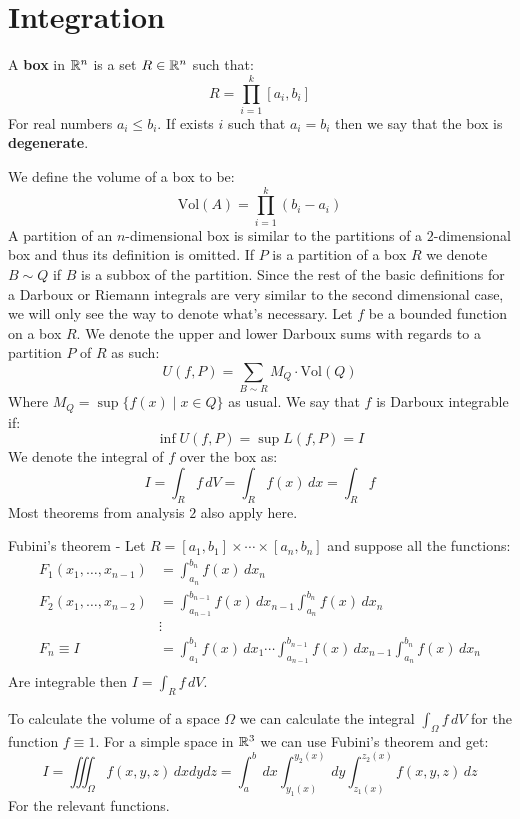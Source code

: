 \documentclass[11pt,a4paper]{article}
\begin{document}
	\section{Integration}
	\begin{definition}
		A \textbf{box} in $\mathbb{R}^n$ is a set $R \in \mathbb{R}^n$ such that:
		\[
			R = \prod_{i=1}^{k}{[a_i,b_i]}
		\]
		For real numbers $a_i \le b_i$. If exists $i$ such that $a_i=b_i$
		then we say that the box is \textbf{degenerate}.
	\end{definition}
	We define the volume of a box to be:
	\[
		\mathrm{Vol}(A) = \prod_{i=1}^{k}{(b_i-a_i)}
	\]
	A partition of an $n$-dimensional box is similar to the partitions
	of a $2$-dimensional box and thus its definition is omitted.
	If $P$ is a partition of a box $R$ we denote $B \sim Q$ if
	$B$ is a subbox of the partition. Since the rest of the basic
	definitions for a Darboux or Riemann integrals are very similar
	to the second dimensional case, we will only see the way
	to denote what's necessary. Let $f$ be a bounded function on
	a box $R$. We denote the upper and lower Darboux sums with
	regards to a partition $P$ of $R$ as such:
	\[
		U(f,P) = \sum_{B \sim R}{M_Q \cdot \mathrm{Vol}(Q)}
	\]
	Where $M_Q = \sup\{f(x) \mid x \in Q\}$ as usual. We say
	that $f$ is Darboux integrable if:
	\[
		\inf U(f,P) = \sup L(f,P) = I
	\]
	We denote the integral of $f$ over the box as:
	\[
		I = \int_{R}{f\,dV} = 
		\int_{R}{f(x)\,dx} = \int_{R}{f}
	\]
	Most theorems from analysis $2$ also apply here.
	\begin{definition}
		Fubini's theorem - Let 
		$R = [a_1,b_1] \times \cdots \times [a_n,b_n]$ and suppose
		all the functions:
		\begin{align*}
			F_1(x_1,\dots,x_{n-1}) &= \int_{a_n}^{b_n}{f(x)\,dx_n} \\
			F_2(x_1,\dots,x_{n-2}) 
			&= \int_{a_{n-1}}^{b_{n-1}}{f(x)\,dx_{n-1}}
			\int_{a_n}^{b_n}{f(x)\,dx_n}\\
			&\vdots \\
			F_n \equiv I &= \int_{a_{1}}^{b_{1}}{f(x)\,dx_{1}} \cdots
			\int_{a_{n-1}}^{b_{n-1}}{f(x)\,dx_{n-1}}
			\int_{a_n}^{b_n}{f(x)\,dx_n} \\
		\end{align*}
		Are integrable then $I = \int_{R}{f\,dV}$.
	\end{definition}
	To calculate the volume of a space $\Omega$ we can calculate
	the integral $\int_{\Omega}{f\,dV}$ for the function $f \equiv 1$.
	For a simple space in $\mathbb{R}^3$ we can use Fubini's theorem and get:
	\[
		I = \iiint_{\Omega}{f(x,y,z)\,dxdydz}
		  = \int_{a}^{b}{\,dx}
		  	\int_{y_1(x)}^{y_2(x)}{\,dy}
		  	\int_{z_1(x)}^{z_2(x)}{f(x,y,z)\,dz}
	\]
	For the relevant functions. \hfill
	
\end{document}
